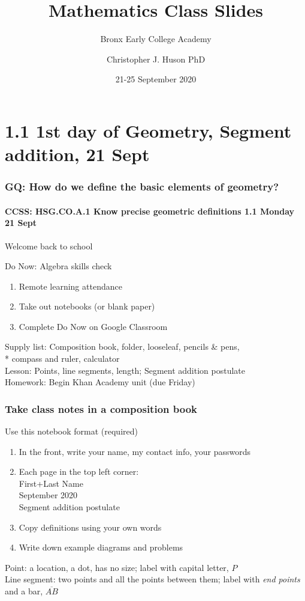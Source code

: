 \documentclass{beamer}
\title{Mathematics Class Slides}
\subtitle{Bronx Early College Academy}
\author{Christopher J. Huson PhD}
\date{21-25 September 2020}
\begin{document}
\frame{\titlepage}
\section[Outline]{}
\frame{\tableofcontents}

\section{1.1 1st day of Geometry, Segment addition, 21 Sept}
\frame
{
  \frametitle{GQ: How do we define the basic elements of geometry?}
  \framesubtitle{CCSS: HSG.CO.A.1 Know precise geometric definitions \hfill \alert{1.1 Monday 21 Sept}}

  Welcome back to school
  \begin{block}{Do Now: Algebra skills check}
  \begin{enumerate}
      \item Remote learning attendance
      \item Take out notebooks (or blank paper)
      \item Complete Do Now on Google Classroom
  \end{enumerate}
  \end{block}
  Supply list: Composition book, folder, looseleaf, pencils \& pens, \\*
  compass and ruler, calculator \\
  Lesson: Points, line segments, length; Segment addition postulate \\
  Homework: Begin Khan Academy unit (due Friday)
}

  \frame
  {
    \frametitle{Take class notes in a composition book}
    \begin{block}{Use this notebook format (required)}
      \begin{enumerate}
        \item In the front, write your name, my contact info, your passwords
        \item Each page in the top left corner: \\ \qquad First+Last Name \\
         September 2020 \\ \qquad Segment addition postulate \vspace{0.25cm}
        \item Copy definitions using your own words
        \item Write down example diagrams and problems
      \end{enumerate}
      \end{block}
    Point: a location, a dot, has no size; label with capital letter, $P$ \\[0.25cm]
    Line segment: two points and all the points between them; label with \emph{end points} and a bar, $\overline{AB}$ \\
  }
\end{document}

